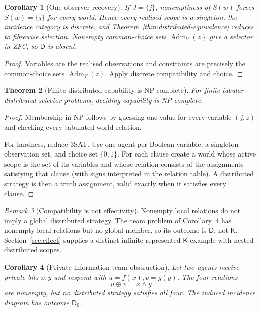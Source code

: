 \documentclass[11pt]{article}
\theoremstyle{plain}
\newtheorem{theorem}{Theorem}[section]
\newtheorem{corollary}[theorem]{Corollary}
\theoremstyle{definition}
\theoremstyle{remark}
\newtheorem{remark}[theorem]{Remark}
\newcommand{\Adm}{\operatorname{Adm}}
\begin{document}
\begin{corollary}[One-observer recovery]\label{cor:distributed-one}
If $J=\{j\}$, nonemptiness of $S(w)$ forces $S(w)=\{j\}$ for every world.
Hence every realised scope is a singleton, the incidence category is discrete,
and Theorem~\ref{thm:distributed-equivalence} reduces to fibrewise selection. Nonempty common-choice sets $\Adm_V(z)$ give a selector in ZFC, so $\mathsf D$ is absent.
\end{corollary}

\begin{proof}
Variables are the realised observations and constraints are precisely the
common-choice sets $\Adm_V(z)$. Apply discrete compatibility and choice.
\end{proof}

\begin{theorem}[Finite distributed capability is NP-complete]
\label{thm:distributed-NP}
For finite tabular distributed selector problems, deciding capability is
NP-complete.
\end{theorem}

\begin{proof}
Membership in NP follows by guessing one value for every variable $(j,z)$ and
checking every tabulated world relation.

For hardness, reduce 3SAT. Use one agent per Boolean variable, a singleton
observation set, and choice set $\{0,1\}$. For each clause create a world whose
active scope is the set of its variables and whose relation consists of the
assignments satisfying that clause (with signs interpreted in the
relation table). A distributed strategy is then a truth assignment, valid
exactly when it satisfies every clause.
\end{proof}

\begin{remark}[Compatibility is not effectivity]
Nonempty local relations do not imply a global distributed strategy. The team
problem of Corollary~\ref{cor:team-decision} has nonempty local relations but no global member, so its outcome
is $\mathsf D$, not $\mathsf K$. Section~\ref{sec:effect} supplies a distinct infinite represented
$\mathsf K$ example with nested distributed scopes.
\end{remark}



\begin{corollary}[Private-information team obstruction]
\label{cor:team-decision}
Let two agents receive private bits $x,y$ and respond with
$u=f(x),v=g(y)$. The four relations
\[
u\oplus v=x\wedge y
\]
are nonempty, but no distributed strategy satisfies all four. The induced
incidence diagram has outcome $\mathsf D_0$.
\end{corollary}
\end{document}
